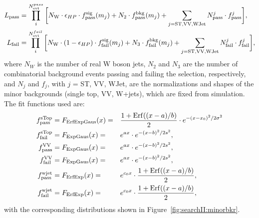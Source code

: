 \begin{align*}
\footnotesize
    L_{\rm pass} &= \prod_{i}^{N_{\rm evt}^{pass}} \bigg[N_{\rm W}\cdot\epsilon_{HP}\cdot f_{\rm pass}^{\rm sig}(m_{j}) + N_{\rm 2}\cdot f_{\rm pass}^{\rm bkg}(m_{j})+ \sum_{j=\textrm{ST,VV,WJet}} N^{j}_{\rm pass}\cdot f_{\rm pass}^{j}\bigg],\\
    L_{\rm fail} &= \prod_{i}^{N_{\rm evt}^{fail}} \bigg[N_{\rm W}\cdot(1-\epsilon_{HP})\cdot f^{\rm sig}_{\rm fail}(m_{j}) + N_{\rm 3}\cdot f_{\rm fail}^{\rm bkg}(m_{j})+ \sum_{j=\textrm{ST,VV,WJet}} N^{j}_{\rm fail}\cdot f_{\rm fail}^{j}\bigg],
\end{align*}
where $N_{W}$ is the number of real W boson jets, $N_{2}$ and $N_{3}$ are the number of combinatorial background events passing and failing the \nsubj selection, respectively, and $N_{j}$ and $f_{j}$, with $j$ = ST, VV, WJet, are the normalizations and shapes of the minor backgrounds (single top, VV, W+jets), which are fixed from simulation. The fit functions used are:
\begin{alignat*}{3}
    f_{\rm pass}^{\rm sTop} &= F_{\rm ErfExpGaus}(x) = &&\frac{1 + {\rm Erf}((x-a)/b)}{2} \cdot e^{-(x-x_{0})^{2}/2\sigma^{2}}\\
    f_{\rm fail}^{\rm sTop} &= F_{\rm ExpGaus}(x)    = &&e^{ax} \cdot e^{-(x-b)^{2}/2s^{2}},\\
    f_{\rm pass}^{\rm VV}   &= F_{\rm ExpGaus}(x)    = &&e^{ax} \cdot e^{-(x-b)^{2}/2s^{2}},\\
    f_{\rm fail}^{\rm VV}   &= F_{\rm ExpGaus}(x)    = &&e^{ax} \cdot e^{-(x-b)^{2}/2s^{2}},\\
    f_{\rm pass}^{\rm wjet} &= F_{\rm ErfExp}(x)     = &&e^{c_0x} \cdot \frac{1 + {\rm Erf}((x-a)/b)}{2},\\
    f_{\rm fail}^{\rm wjet} &= F_{\rm ErfExp}(x)     = &&e^{c_0x} \cdot \frac{1 + {\rm Erf}((x-a)/b)}{2},
\end{alignat*}
with the corresponding distributions shown in Figure~\ref{fig:searchII:minorbkr}.
